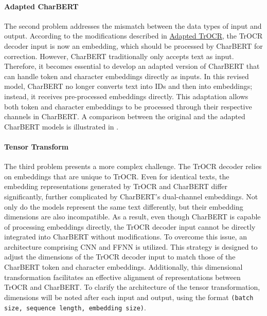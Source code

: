 \paragraph*{Adapted CharBERT}
\label{par:3_adapted_charbert}
The second problem addresses the mismatch between the data types of input and output. According to the modifications described in \hyperref[par:3_adapted_trocr]{Adapted TrOCR}, the TrOCR decoder input is now an embedding, which should be processed by CharBERT for correction. However, CharBERT traditionally only accepts text as input. Therefore, it becomes essential to develop an adapted version of CharBERT that can handle token and character embeddings directly as inputs. In this revised model, CharBERT no longer converts text into IDs and then into embeddings; instead, it receives pre-processed embeddings directly. This adaptation allows both token and character embeddings to be processed through their respective channels in CharBERT. A comparison between the original and the adapted CharBERT models is illustrated in .


\paragraph*{Tensor Transform}
\label{par:3_tensor_transform}
The third problem presents a more complex challenge. The TrOCR decoder relies on embeddings that are unique to TrOCR. Even for identical texts, the embedding representations generated by TrOCR and CharBERT differ significantly, further complicated by CharBERT's dual-channel embeddings. Not only do the models represent the same text differently, but their embedding dimensions are also incompatible. As a result, even though CharBERT is capable of processing embeddings directly, the TrOCR decoder input cannot be directly integrated into CharBERT without modifications. To overcome this issue, an architecture comprising CNN and FFNN is utilized. This strategy is designed to adjust the dimensions of the TrOCR decoder input to match those of the CharBERT token and character embeddings. Additionally, this dimensional transformation facilitates an effective alignment of representations between TrOCR and CharBERT. To clarify the architecture of the tensor transformation, dimensions will be noted after each input and output, using the format \texttt{(batch size, sequence length, embedding size)}.

